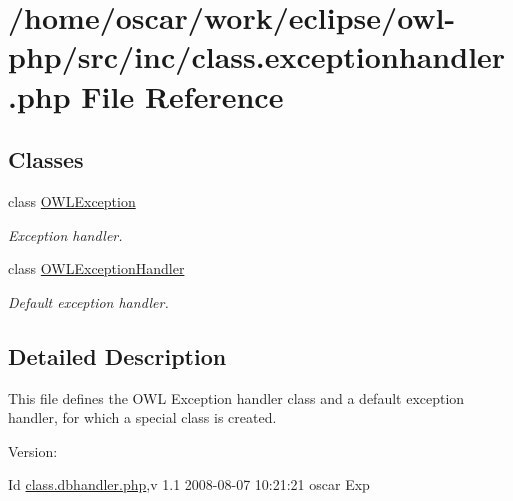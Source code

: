 \hypertarget{class_8exceptionhandler_8php}{
\section{/home/oscar/work/eclipse/owl-php/src/inc/class.exceptionhandler.php File Reference}
\label{class_8exceptionhandler_8php}
}
\subsection*{Classes}
\begin{CompactItemize}
\item 
class \hyperlink{classOWLException}{OWLException}
\begin{CompactList}\small\item\em Exception handler. \item\end{CompactList}\item 
class \hyperlink{classOWLExceptionHandler}{OWLExceptionHandler}
\begin{CompactList}\small\item\em Default exception handler. \item\end{CompactList}\end{CompactItemize}


\subsection{Detailed Description}
This file defines the OWL Exception handler class and a default exception handler, for which a special class is created. \begin{Desc}
\item[Version:]\end{Desc}
\begin{Desc}
\item[Id]\hyperlink{class_8dbhandler_8php}{class.dbhandler.php},v 1.1 2008-08-07 10:21:21 oscar Exp \end{Desc}
